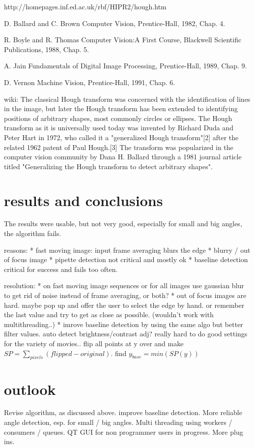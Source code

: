http://homepages.inf.ed.ac.uk/rbf/HIPR2/hough.htm

D. Ballard and C. Brown Computer Vision, Prentice-Hall, 1982, Chap. 4.

R. Boyle and R. Thomas Computer Vision:A First Course, Blackwell Scientific Publications, 1988, Chap. 5.

A. Jain Fundamentals of Digital Image Processing, Prentice-Hall, 1989, Chap. 9.

D. Vernon Machine Vision, Prentice-Hall, 1991, Chap. 6. 


wiki:
The classical Hough transform was concerned with the identification of lines in the image, but later the Hough transform has been extended to identifying positions of arbitrary shapes, most commonly circles or ellipses. The Hough transform as it is universally used today was invented by Richard Duda and Peter Hart in 1972, who called it a "generalized Hough transform"[2] after the related 1962 patent of Paul Hough.[3] The transform was popularized in the computer vision community by Dana H. Ballard through a 1981 journal article titled "Generalizing the Hough transform to detect arbitrary shapes".





\section{results and conclusions}

The results were usable, but not very good, especially for small and big angles, the algorithm fails.

reasons:
* fast moving image: input frame averaging blurs the edge
* blurry / out of focus image
* pipette detection not critical and mostly ok
* baseline detection critical for success and fails too often.


resolution:
* on fast moving image sequences or for all images use gaussian blur to get rid of noise instead of frame averaging, or both?
* out of focus images are hard. maybe pop up and offer the user to select the edge by hand. or remember the last value and try to get as close as possible. (wouldn't work with multithreading..)
* imrove baseline detection by using the same algo but better filter values. auto detect brightness/contrast adj? really hard to do good settings for the variety of movies..
 flip all points at y over and make $SP=\sum_{pixels}(flipped - original)$. find $y_{base} = min(SP(y))$

\section{outlook}

Revise algorithm, as discussed above. improve baseline detection.
More reliable angle detection, esp. for small / big angles.
Multi threading using workers / consumers / queues.
QT GUI for non programmer users in progress.
More plug ins.


